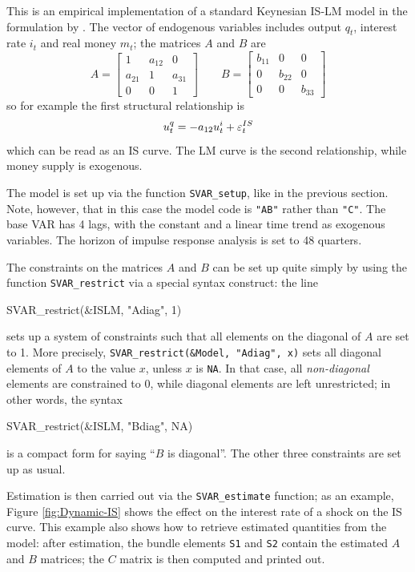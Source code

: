 \documentclass[a4paper,10pt]{article}
\newcommand{\PrE}[1]{\ensuremath u_{#1}} %
\newcommand{\StS}[1]{\ensuremath \varepsilon_{#1}} %
\begin{document}
This is an empirical implementation of a standard Keynesian IS-LM
model in the formulation by \cite{Pagan95}. The vector of endogenous
variables includes output $q_t$, interest rate $i_t$ and real money
$m_t$; the matrices $A$ and $B$ are
\[
A = \left[ \begin{array}{ccc}
    1 & a_{12} & 0 \\ a_{21} & 1 & a_{31} \\ 0 & 0 & 1
  \end{array} \right]
\qquad
B = \left[ \begin{array}{ccc}
    b_{11} & 0 & 0 \\ 0 & b_{22} & 0 \\ 0 & 0 & b_{33}
  \end{array} \right]
\]
so for example the first structural relationship is
\begin{equation}
  \label{eq:AB-IScurve}
  \PrE{t}^q = -a_{12} \PrE{t}^i + \StS{t}^{IS}
\end{equation}
which can be read as an IS curve. The LM curve is the second
relationship, while money supply is exogenous.

The model is set up via the function \texttt{SVAR\_setup}, like in the
previous section. Note, however, that in this case the model code is
\texttt{"AB"} rather than \texttt{"C"}.  The base VAR has 4 lags, with
the constant and a linear time trend as exogenous variables. The
horizon of impulse response analysis is set to 48 quarters.

The constraints on the matrices $A$ and $B$ can be set up quite simply
by using the function \texttt{SVAR\_restrict} via a special syntax
construct: the line
\begin{code}
  SVAR_restrict(&ISLM, "Adiag", 1)
\end{code}
sets up a system of constraints such that all elements on the diagonal
of $A$ are set to 1. More precisely, \texttt{SVAR\_restrict(\&Model,
  "Adiag", x)} sets all diagonal elements of $A$ to the value $x$,
unless $x$ is \texttt{NA}. In that case, all \emph{non-diagonal}
elements are constrained to 0, while diagonal elements are left
unrestricted; in other words, the syntax
\begin{code}
  SVAR_restrict(&ISLM, "Bdiag", NA)
\end{code}
is a compact form for saying ``$B$ is diagonal''. The other three
constraints are set up as usual.

Estimation is then carried out via the \texttt{SVAR\_estimate}
function; as an example, Figure \ref{fig:Dynamic-IS} shows the effect
on the interest rate of a shock on the IS curve.  This example also
shows how to retrieve estimated quantities from the model: after
estimation, the bundle elements \texttt{S1} and \texttt{S2}
contain the estimated $A$ and $B$ matrices; the $C$ matrix is then
computed and printed out.
\end{document}
